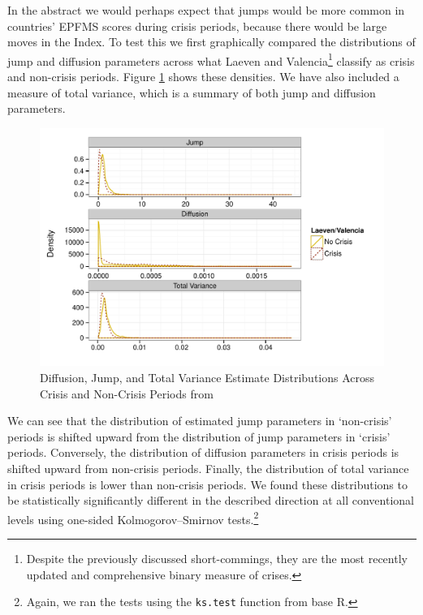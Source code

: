 \documentclass[]{article}
\begin{document}
In the abstract we would perhaps expect that jumps would be more common in countries' EPFMS scores during crisis periods, because there would be large moves in the Index. To test this we first graphically compared the distributions of jump and diffusion parameters across what Laeven and Valencia\footnote{Despite the previously discussed short-commings, they are the most recently updated and comprehensive binary measure of crises.} classify as crisis and non-crisis periods. Figure \ref{comp_jump_diff} shows these densities. We have also included a measure of total variance, which is a summary of both jump and diffusion parameters.

\begin{figure}
    \caption{Diffusion, Jump, and Total Variance Estimate Distributions Across Crisis and Non-Crisis Periods from \cite{laeven2013}}
    \label{comp_jump_diff}
    \begin{center}
        \includegraphics[scale=0.7]{analysis/figures/compare_jump_diffusion_basic.pdf}
    \end{center}
\end{figure}

We can see that the distribution of estimated jump parameters in `non-crisis' periods is shifted upward from the distribution of jump parameters in `crisis' periods. Conversely, the distribution of diffusion parameters in crisis periods is shifted upward from non-crisis periods. Finally, the distribution of total variance in crisis periods is lower than non-crisis periods. We found these distributions to be statistically significantly different in the described direction at all conventional levels using one-sided Kolmogorov–Smirnov tests.\footnote{Again, we ran the tests using the \texttt{ks.test} function from base R.}
\end{document}
